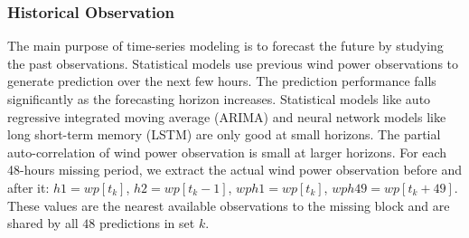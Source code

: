 \documentclass[conference]{IEEEtran}
\begin{document}

\subsubsection{Historical Observation}
The main purpose of time-series modeling is to forecast the future by studying the past observations. Statistical models use previous wind power observations to generate prediction over the next few hours. The prediction performance falls significantly as the forecasting horizon increases. Statistical models like auto regressive integrated moving average (ARIMA) and neural network models like long short-term memory (LSTM) are only good at small horizons. The partial auto-correlation of wind power observation is small at larger horizons.
For each 48-hours missing period, we extract the actual wind power observation before and after it: $h1 = wp[t_k]$, $h2 = wp[t_k-1]$, $wph1 = wp[t_k]$, $wph49 = wp[t_k+49]$. These values are the nearest available observations to the missing block and are shared by all $48$ predictions in set $k$. %
\end{document}
